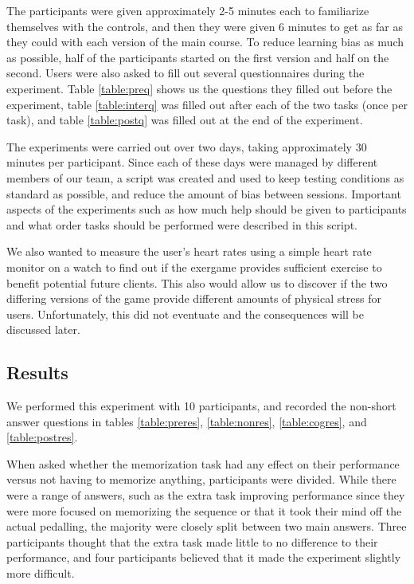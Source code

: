 \documentclass[11pt, 
]{IEEEtran}
\begin{document}
The participants were given approximately 2-5 minutes each to familiarize themselves with the controls, and then they were given 6 minutes to get as far as they could with each version of the main course. To reduce learning bias as much as possible, half of the participants started on the first version and half on the second.
Users were also asked to fill out several questionnaires during the experiment. Table \ref{table:preq} shows us the questions they filled out before the experiment, table \ref{table:interq} was filled out after each of the two tasks (once per task), and table \ref{table:postq} was filled out at the end of the experiment.

The experiments were carried out over two days, taking approximately 30 minutes per participant. Since each of these days were managed by different members of our team, a script was created and used to keep testing conditions as standard as possible, and reduce the amount of bias between sessions. Important aspects of the experiments such as how much help should be given to participants and what order tasks should be performed were described in this script.

We also wanted to measure the user's heart rates using a simple heart rate monitor on a watch to find out if the exergame provides sufficient exercise to benefit potential future clients. This also would allow us to discover if the two differing versions of the game provide different amounts of physical stress for users. Unfortunately, this did not eventuate and the consequences will be discussed later.

\subsection{Results} %

We performed this experiment with 10 participants, and recorded the non-short answer questions in tables \ref{table:preres}, \ref{table:nonres}, \ref{table:cogres}, and \ref{table:postres}.

When asked whether the memorization task had any effect on their performance versus not having to memorize anything, participants were divided. While there were a range of answers, such as the extra task improving performance since they were more focused on memorizing the sequence or that it took their mind off the actual pedalling, the majority were closely split between two main answers. Three participants thought that the extra task made little to no difference to their performance, and four participants believed that it made the experiment slightly more difficult.
\end{document}
